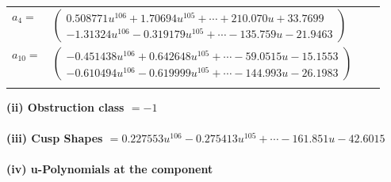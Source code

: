 \documentclass[1p]{elsarticle_modified}
\theoremstyle{definition}
\begin{document}
\begin{tabular}{m{7pt} m{180pt} m{7pt} m{180pt} }
\flushright $a_{4}=$&$\begin{pmatrix}0.508771 u^{106}+1.70694 u^{105}+\cdots+210.070 u+33.7699\\-1.31324 u^{106}-0.319179 u^{105}+\cdots-135.759 u-21.9463\end{pmatrix}$ \\
\flushright $a_{10}=$&$\begin{pmatrix}-0.451438 u^{106}+0.642648 u^{105}+\cdots-59.0515 u-15.1553\\-0.610494 u^{106}-0.619999 u^{105}+\cdots-144.993 u-26.1983\end{pmatrix}$\\&\end{tabular}
\flushleft \textbf{(ii) Obstruction class $= -1$}\\~\\
\flushleft \textbf{(iii) Cusp Shapes $= 0.227553 u^{106}-0.275413 u^{105}+\cdots-161.851 u-42.6015$}\\~\\
\newpage\renewcommand{\arraystretch}{1}
\flushleft \textbf{(iv) u-Polynomials at the component}\newline \\
\end{document}
